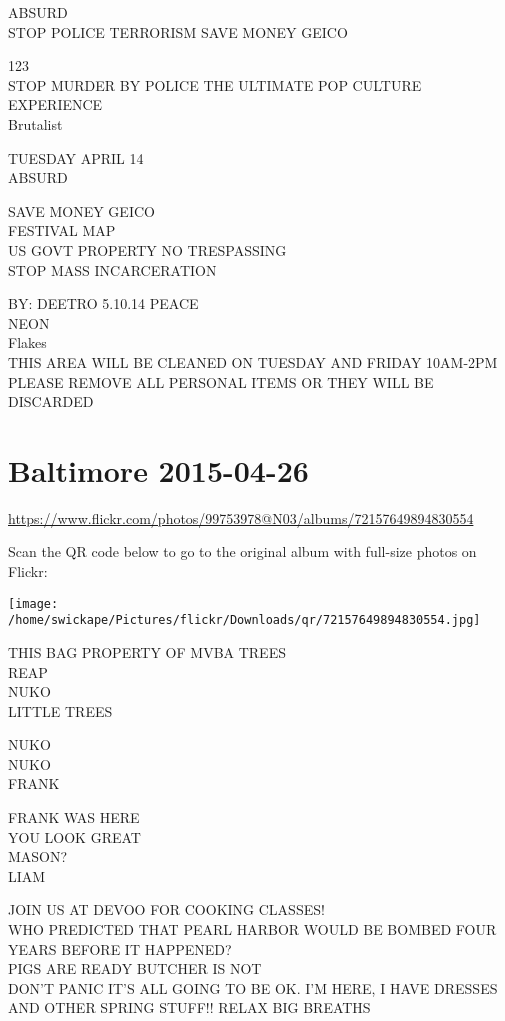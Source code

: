 \documentclass[10pt,letterpaper]{article}
\begin{document}
ABSURD\\
STOP POLICE TERRORISM SAVE MONEY GEICO

123\\
STOP MURDER BY POLICE THE ULTIMATE POP CULTURE EXPERIENCE\\
Brutalist

TUESDAY APRIL 14\\
ABSURD

SAVE MONEY GEICO\\
FESTIVAL MAP\\
US GOVT PROPERTY NO TRESPASSING\\
STOP MASS INCARCERATION

BY: DEETRO 5.10.14 PEACE\\
NEON\\
Flakes\\
THIS AREA WILL BE CLEANED ON TUESDAY AND FRIDAY 10AM{-}2PM PLEASE REMOVE ALL PERSONAL ITEMS OR THEY WILL BE DISCARDED
\pagebreak

\section*{Baltimore 2015-04-26}

\url{https://www.flickr.com/photos/99753978@N03/albums/72157649894830554}

Scan the QR code below to go to the original album with full-size photos on Flickr:

\texttt{[image: /home/swickape/Pictures/flickr/Downloads/qr/72157649894830554.jpg]}
\pagebreak

THIS BAG PROPERTY OF MVBA TREES\\
REAP\\
NUKO\\
LITTLE TREES

NUKO\\
NUKO\\
FRANK

FRANK WAS HERE\\
YOU LOOK GREAT\\
MASON?\\
LIAM

JOIN US AT DEVOO FOR COOKING CLASSES!\\
WHO PREDICTED THAT PEARL HARBOR WOULD BE BOMBED FOUR YEARS BEFORE IT HAPPENED?\\
PIGS ARE READY BUTCHER IS NOT\\
DON'T PANIC IT'S ALL GOING TO BE OK.  I'M HERE, I HAVE DRESSES AND OTHER SPRING STUFF!!  RELAX BIG BREATHS
\end{document}
